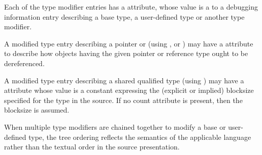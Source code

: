 Each of the type modifier entries has 
a 
\DWATtype{} attribute,
whose value is a  
to a debugging information entry
describing a base type, a user-defined type or another type
modifier.

A modified type entry describing a 
pointer or 
(using \DWTAGpointertype,
\DWTAGreferencetype{} or
\DWTAGrvaluereferencetype) 
may
have 
\hypertarget{chap:DWATadressclasspointerorreferencetypes}{}
a 
\DWATaddressclass{}
attribute to describe how objects having the given pointer
or reference type ought to be dereferenced.

A modified type entry describing a  shared qualified type
(using \DWTAGsharedtype) may have a
\DWATcount{} attribute
whose value is a constant expressing the (explicit or implied) blocksize specified for the
type in the source. If no count attribute is present, then the 
blocksize is assumed.

When multiple type modifiers are chained together to modify
a base or user-defined type, the tree ordering reflects the
semantics of the 
applicable language 
rather 
than 
the 
textual
order 
in 
the 
source 
presentation.

